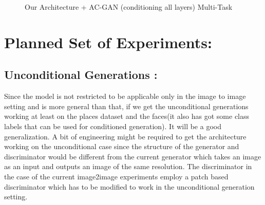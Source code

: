 \begin{figure}%
    \centering
    \caption{Our Architecture + AC-GAN (conditioning all layers) Multi-Task}
    \label{fig:channel_gated_multi-task}
    \vspace{-3mm}
\end{figure}

\section{Planned Set of Experiments:}
\subsection{Unconditional Generations :}
Since the model is not restricted to be applicable only in the image to image setting and is more general than that, if we get the unconditional generations working at least on the places dataset and the faces(it also has got some class labels that can be used for conditioned generation). It will be a good generalization. A bit of engineering might be required to get the architecture working on the unconditional case since the structure of the generator and discriminator would be different from the current generator which takes an image as an input and outputs an image of the same resolution. The discriminator in the case of the current image2image experiments employ a patch based discriminator which has to be modified to work in the unconditional generation setting.






